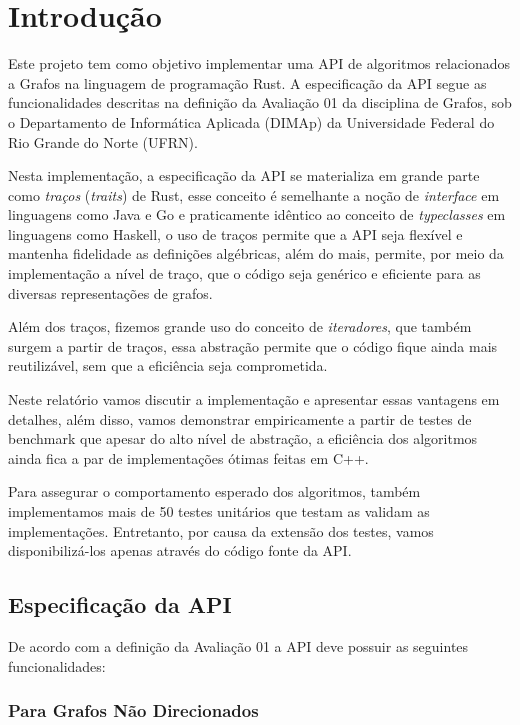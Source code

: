\chapter{Introdução}
\label{ch:intro}

Este projeto tem como objetivo implementar uma API de
algoritmos relacionados a Grafos na linguagem de programação Rust. A
especificação da API segue as funcionalidades descritas na
definição da Avaliação 01 da disciplina de Grafos, sob o Departamento
de Informática Aplicada (DIMAp) da Universidade Federal do Rio Grande
do Norte (UFRN).

Nesta implementação, a especificação da API se materializa em grande
parte como \emph{traços} (\textit{traits}) de Rust, esse conceito é
semelhante a noção de \textit{interface} em linguagens como Java
e Go e praticamente idêntico ao conceito de \textit{typeclasses} em
linguagens como Haskell, o uso de traços permite que a API seja
flexível e mantenha fidelidade as definições algébricas, além do
mais, permite, por meio da implementação a nível de traço, que o código
seja genérico e eficiente para as diversas representações de grafos.

Além dos traços, fizemos grande uso do conceito de \textit{iteradores}, que
também surgem a partir de traços, essa abstração permite que o código
fique ainda mais reutilizável, sem que a eficiência seja comprometida.

Neste relatório vamos discutir a implementação e apresentar essas
vantagens em detalhes, além disso, vamos demonstrar empiricamente a
partir de testes de benchmark que apesar do alto nível de abstração,
a eficiência dos algoritmos ainda fica a par de implementações ótimas
feitas em C++.

Para assegurar o comportamento esperado dos algoritmos, também
implementamos mais de 50 testes unitários que testam as
validam as implementações. Entretanto, por causa da extensão dos testes, vamos
disponibilizá-los apenas através do código fonte da API.

\section{Especificação da API}
\label{sec:api_spec}

De acordo com a definição da Avaliação 01 a API deve possuir as
seguintes funcionalidades:

\subsection{Para Grafos Não Direcionados}

